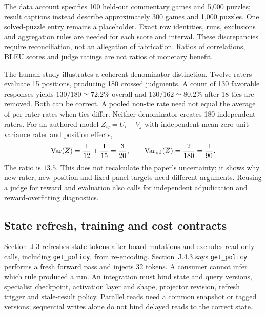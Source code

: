 The data account specifies 100 held-out commentary games and 5,000 puzzles; result captions instead describe approximately 300 games and 1,000 puzzles. One solved-puzzle entry remains a placeholder. Exact row identities, runs, exclusions and aggregation rules are needed for each score and interval. These discrepancies require reconciliation, not an allegation of fabrication. Ratios of correlations, BLEU scores and judge ratings are not ratios of monetary benefit.~\citep{exec24_collaboration_original}

The human study illustrates a coherent denominator distinction. Twelve raters evaluate 15 positions, producing 180 crossed judgments. A count of 130 favorable responses yields $130/180\simeq72.2\%$ overall and $130/162\simeq80.2\%$ after 18 ties are removed. Both can be correct. A pooled non-tie rate need not equal the average of per-rater rates when ties differ. Neither denominator creates 180 independent raters. For an authored model $Z_{ij}=U_i+V_j$ with independent mean-zero unit-variance rater and position effects,
\begin{equation}
 \operatorname{Var}(\overline Z)=\frac1{12}+\frac1{15}=\frac3{20},\qquad
 \operatorname{Var}_{\rm iid}(\overline Z)=\frac2{180}=\frac1{90}.
 \label{eq:exec24-collaboration-crossed}
\end{equation}
The ratio is $13.5$. This does not recalculate the paper's uncertainty; it shows why new-rater, new-position and fixed-panel targets need different arguments. Reusing a judge for reward and evaluation also calls for independent adjudication and reward-overfitting diagnostics.~\citep{exec24_collaboration_original,exec24_collaboration_reference}

\subsection{State refresh, training and cost contracts}
Section~J.3 refreshes state tokens after board mutations and excludes read-only calls, including \texttt{get\_policy}, from re-encoding. Section~J.4.3 says \texttt{get\_policy} performs a fresh forward pass and injects 32 tokens. A consumer cannot infer which rule produced a run. An integration must bind state and query versions, specialist checkpoint, activation layer and shape, projector revision, refresh trigger and stale-result policy. Parallel reads need a common snapshot or tagged versions; sequential writes alone do not bind delayed reads to the correct state.~\citep{exec24_collaboration_original}


